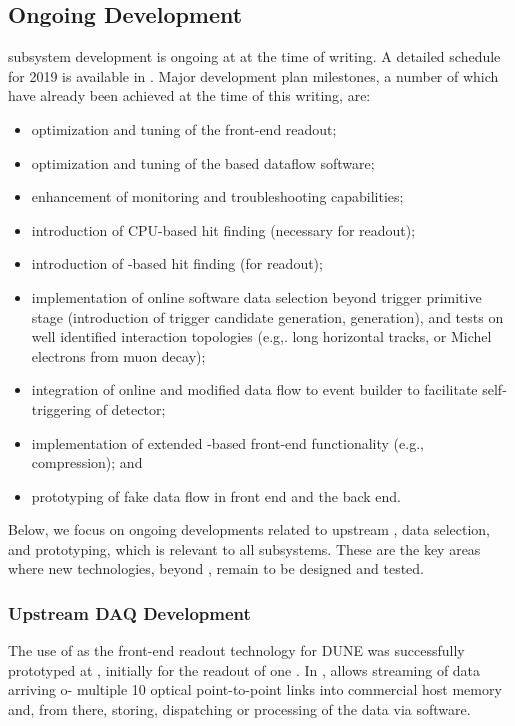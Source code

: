 \subsection{Ongoing Development}
\label{sec:daq:design-validation}

 subsystem development is ongoing at  at the time of
writing. A detailed schedule for 2019 is available
in \cite{bib:docdb14095}. Major development plan milestones, a number
of which have already been achieved at the time of this writing, are:
\begin{itemize}
\item optimization and tuning of the front-end readout;
\item optimization and tuning of the  based dataflow software;
\item enhancement of monitoring and troubleshooting capabilities;
\item introduction of CPU-based hit finding (necessary for  readout);
\item introduction of -based hit finding (for  readout);
\item implementation of online software data selection beyond trigger
primitive stage (introduction of trigger candidate generation, 
 generation), and tests on well identified interaction
topologies (e.g,. long horizontal tracks, or Michel electrons from muon decay);
\item integration of online  and modified data flow to event
builder to facilitate self-triggering of detector;
\item implementation of extended -based front-end functionality
(e.g., compression); and
\item prototyping of fake  data flow in front end and the back end.
\end{itemize}

Below, we focus on ongoing developments related to upstream ,
data selection, and  prototyping, which is relevant to all  subsystems. These are the key areas where new technologies, beyond , remain to be designed and tested.


\subsubsection{Upstream DAQ Development}

The use of  as the front-end readout technology for DUNE was
successfully prototyped at , initially for the readout of one
. In ,  allows streaming of data arriving o- multiple \SI{10}{\Gbps} optical point-to-point links into commercial host memory and,
from there, storing, dispatching or processing of the data via
software. 


